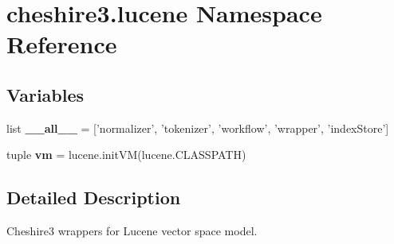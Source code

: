 \hypertarget{namespacecheshire3_1_1lucene}{\section{cheshire3.\-lucene Namespace Reference}
\label{namespacecheshire3_1_1lucene}
}
\subsection*{Variables}
\begin{DoxyCompactItemize}
\item 
\hypertarget{namespacecheshire3_1_1lucene_af268bd74c3c726007f6a7f8018679e71}{list {\bfseries \-\_\-\-\_\-all\-\_\-\-\_\-} = \mbox{[}'normalizer', 'tokenizer', 'workflow', 'wrapper', 'index\-Store'\mbox{]}}\label{namespacecheshire3_1_1lucene_af268bd74c3c726007f6a7f8018679e71}

\item 
\hypertarget{namespacecheshire3_1_1lucene_a010d01d792a65d24ab28f9fbc1382b2f}{tuple {\bfseries vm} = lucene.\-init\-V\-M(lucene.\-C\-L\-A\-S\-S\-P\-A\-T\-H)}\label{namespacecheshire3_1_1lucene_a010d01d792a65d24ab28f9fbc1382b2f}

\end{DoxyCompactItemize}


\subsection{Detailed Description}
\begin{DoxyVerb}Cheshire3 wrappers for Lucene vector space model.\end{DoxyVerb}
 
